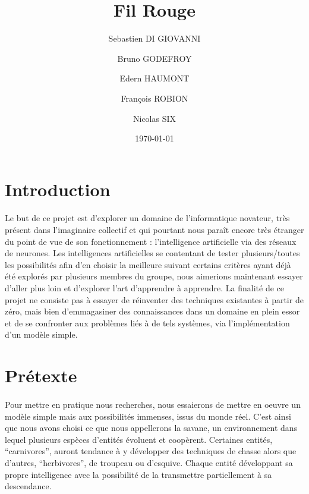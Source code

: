 \documentclass[a4paper, 12pts]{article}
\title{Fil Rouge}
\author{Sebastien DI GIOVANNI}
\author{Bruno GODEFROY}
\author{Edern HAUMONT}
\author{François ROBION}
\author{Nicolas SIX}
\affil{}
\date{\today}
\begin{document}

\maketitle



\section{Introduction}
\paragraph{}
	Le but de ce projet est d'explorer un domaine de l'informatique novateur, très présent dans l'imaginaire collectif et qui pourtant nous paraît encore très étranger du point de vue de son fonctionnement : l'intelligence artificielle via des réseaux de neurones. Les intelligences artificielles se contentant de tester plusieurs/toutes les possibilités afin d'en choisir la meilleure suivant certains critères ayant déjà été explorés par plusieurs membres du groupe, nous aimerions maintenant essayer d'aller plus loin et d'explorer l'art d'apprendre à apprendre. La finalité de ce projet ne consiste pas à essayer de réinventer des techniques existantes à partir de zéro, mais bien d'emmagasiner des connaissances dans un domaine en plein essor et de se confronter aux problèmes liés à de tels systèmes, via l'implémentation d'un modèle simple.

\section{Prétexte}
\paragraph{}
	Pour mettre en pratique nous recherches, nous essaierons de mettre en oeuvre un modèle simple mais aux possibilités immenses, issus du monde réel. C'est ainsi que nous avons choisi ce que nous appellerons la savane, un environnement dans lequel plusieurs espèces d'entités évoluent et coopèrent. Certaines entités, “carnivores”, auront tendance à y développer des techniques de chasse alors que d'autres, “herbivores”, de troupeau ou d'esquive. Chaque entité développant sa propre intelligence avec la possibilité de la transmettre partiellement à sa descendance.
\end{document}
